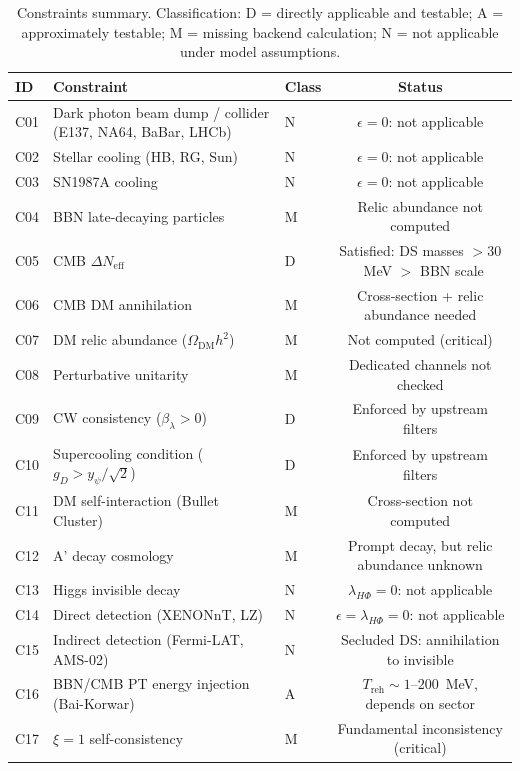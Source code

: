 \documentclass[12pt,a4paper]{article}
\begin{document}
\begin{table}[H]
\centering
\caption{Constraints summary. Classification: D = directly applicable and testable; A = approximately testable; M = missing backend calculation; N = not applicable under model assumptions.}
\label{tab:constraints}
\small
\begin{tabular}{lllc}
\toprule
ID & Constraint & Class & Status \\
\midrule
C01 & Dark photon beam dump / collider (E137, NA64, BaBar, LHCb) & N & $\epsilon = 0$: not applicable \\
C02 & Stellar cooling (HB, RG, Sun) & N & $\epsilon = 0$: not applicable \\
C03 & SN1987A cooling & N & $\epsilon = 0$: not applicable \\
C04 & BBN late-decaying particles & M & Relic abundance not computed \\
C05 & CMB $\Delta N_{\text{eff}}$ & D & Satisfied: DS masses $> 30$~MeV $>$ BBN scale \\
C06 & CMB DM annihilation & M & Cross-section + relic abundance needed \\
C07 & DM relic abundance ($\Omega_\text{DM}h^2$) & M & Not computed (critical) \\
C08 & Perturbative unitarity & M & Dedicated channels not checked \\
C09 & CW consistency ($\beta_\lambda > 0$) & D & Enforced by upstream filters \\
C10 & Supercooling condition ($g_D > y_\psi/\sqrt{2}$) & D & Enforced by upstream filters \\
C11 & DM self-interaction (Bullet Cluster) & M & Cross-section not computed \\
C12 & A' decay cosmology & M & Prompt decay, but relic abundance unknown \\
C13 & Higgs invisible decay & N & $\lambda_{H\Phi} = 0$: not applicable \\
C14 & Direct detection (XENONnT, LZ) & N & $\epsilon = \lambda_{H\Phi} = 0$: not applicable \\
C15 & Indirect detection (Fermi-LAT, AMS-02) & N & Secluded DS: annihilation to invisible \\
C16 & BBN/CMB PT energy injection (Bai-Korwar) & A & $T_\text{reh} \sim 1$--$200$~MeV, depends on sector \\
C17 & $\xi = 1$ self-consistency & M & Fundamental inconsistency (critical) \\
\bottomrule
\end{tabular}
\end{table}
\end{document}
